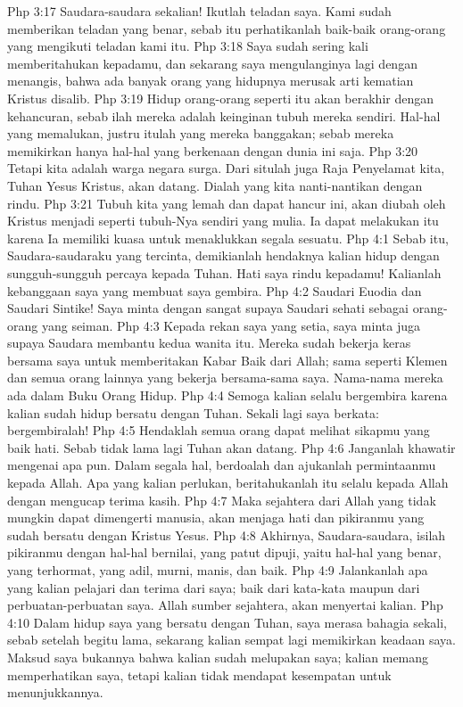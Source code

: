 Php 3:17  Saudara-saudara sekalian! Ikutlah teladan saya. Kami sudah memberikan teladan yang benar, sebab itu perhatikanlah baik-baik orang-orang yang mengikuti teladan kami itu.
Php 3:18  Saya sudah sering kali memberitahukan kepadamu, dan sekarang saya mengulanginya lagi dengan menangis, bahwa ada banyak orang yang hidupnya merusak arti kematian Kristus disalib.
Php 3:19  Hidup orang-orang seperti itu akan berakhir dengan kehancuran, sebab ilah mereka adalah keinginan tubuh mereka sendiri. Hal-hal yang memalukan, justru itulah yang mereka banggakan; sebab mereka memikirkan hanya hal-hal yang berkenaan dengan dunia ini saja.
Php 3:20  Tetapi kita adalah warga negara surga. Dari situlah juga Raja Penyelamat kita, Tuhan Yesus Kristus, akan datang. Dialah yang kita nanti-nantikan dengan rindu.
Php 3:21  Tubuh kita yang lemah dan dapat hancur ini, akan diubah oleh Kristus menjadi seperti tubuh-Nya sendiri yang mulia. Ia dapat melakukan itu karena Ia memiliki kuasa untuk menaklukkan segala sesuatu.
Php 4:1  Sebab itu, Saudara-saudaraku yang tercinta, demikianlah hendaknya kalian hidup dengan sungguh-sungguh percaya kepada Tuhan. Hati saya rindu kepadamu! Kalianlah kebanggaan saya yang membuat saya gembira.
Php 4:2  Saudari Euodia dan Saudari Sintike! Saya minta dengan sangat supaya Saudari sehati sebagai orang-orang yang seiman.
Php 4:3  Kepada rekan saya yang setia, saya minta juga supaya Saudara membantu kedua wanita itu. Mereka sudah bekerja keras bersama saya untuk memberitakan Kabar Baik dari Allah; sama seperti Klemen dan semua orang lainnya yang bekerja bersama-sama saya. Nama-nama mereka ada dalam Buku Orang Hidup.
Php 4:4  Semoga kalian selalu bergembira karena kalian sudah hidup bersatu dengan Tuhan. Sekali lagi saya berkata: bergembiralah!
Php 4:5  Hendaklah semua orang dapat melihat sikapmu yang baik hati. Sebab tidak lama lagi Tuhan akan datang.
Php 4:6  Janganlah khawatir mengenai apa pun. Dalam segala hal, berdoalah dan ajukanlah permintaanmu kepada Allah. Apa yang kalian perlukan, beritahukanlah itu selalu kepada Allah dengan mengucap terima kasih.
Php 4:7  Maka sejahtera dari Allah yang tidak mungkin dapat dimengerti manusia, akan menjaga hati dan pikiranmu yang sudah bersatu dengan Kristus Yesus.
Php 4:8  Akhirnya, Saudara-saudara, isilah pikiranmu dengan hal-hal bernilai, yang patut dipuji, yaitu hal-hal yang benar, yang terhormat, yang adil, murni, manis, dan baik.
Php 4:9  Jalankanlah apa yang kalian pelajari dan terima dari saya; baik dari kata-kata maupun dari perbuatan-perbuatan saya. Allah sumber sejahtera, akan menyertai kalian.
Php 4:10  Dalam hidup saya yang bersatu dengan Tuhan, saya merasa bahagia sekali, sebab setelah begitu lama, sekarang kalian sempat lagi memikirkan keadaan saya. Maksud saya bukannya bahwa kalian sudah melupakan saya; kalian memang memperhatikan saya, tetapi kalian tidak mendapat kesempatan untuk menunjukkannya.
